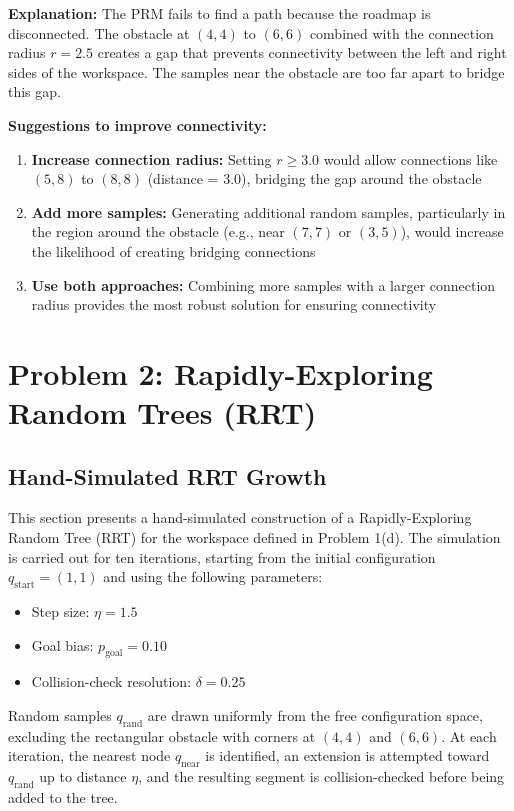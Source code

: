 \documentclass[11pt]{article}
\begin{document}
\textbf{Explanation:} The PRM fails to find a path because the roadmap is disconnected. The obstacle at $(4,4)$ to $(6,6)$ combined with the connection radius $r = 2.5$ creates a gap that prevents connectivity between the left and right sides of the workspace. The samples near the obstacle are too far apart to bridge this gap.

\textbf{Suggestions to improve connectivity:}
\begin{enumerate}
    \item \textbf{Increase connection radius:} Setting $r \geq 3.0$ would allow connections like $(5,8)$ to $(8,8)$ (distance = 3.0), bridging the gap around the obstacle
    \item \textbf{Add more samples:} Generating additional random samples, particularly in the region around the obstacle (e.g., near $(7,7)$ or $(3,5)$), would increase the likelihood of creating bridging connections
    \item \textbf{Use both approaches:} Combining more samples with a larger connection radius provides the most robust solution for ensuring connectivity
\end{enumerate}

\section{Problem 2: Rapidly-Exploring Random Trees (RRT)}

\subsection{Hand-Simulated RRT Growth}

This section presents a hand-simulated construction of a Rapidly-Exploring Random Tree (RRT) for the workspace defined in Problem 1(d).  
The simulation is carried out for ten iterations, starting from the initial configuration $q_{\text{start}} = (1,1)$ and using the following parameters:

\begin{itemize}
    \item Step size: $\eta = 1.5$
    \item Goal bias: $p_{\text{goal}} = 0.10$
    \item Collision-check resolution: $\delta = 0.25$
\end{itemize}

Random samples $q_{\text{rand}}$ are drawn uniformly from the free configuration space, excluding the rectangular obstacle with corners at $(4,4)$ and $(6,6)$.  
At each iteration, the nearest node $q_{\text{near}}$ is identified, an extension is attempted toward $q_{\text{rand}}$ up to distance $\eta$, and the resulting segment is collision-checked before being added to the tree.
\end{document}
